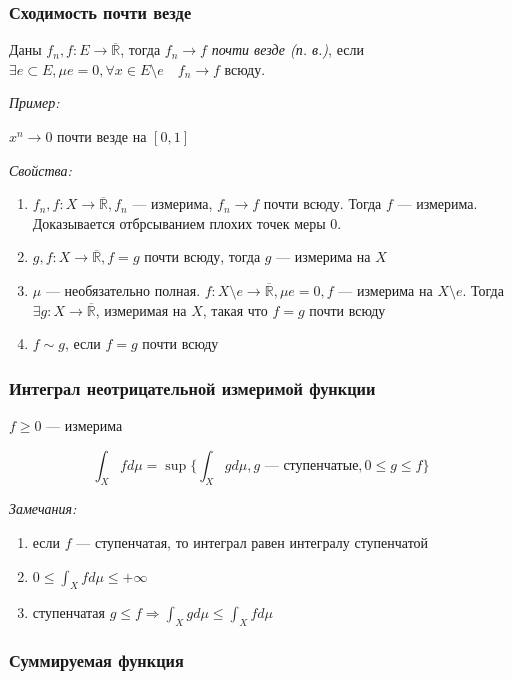 \documentclass{article}
\begin{document}
\subsubsection{Сходимость почти везде}

Даны $f_n, f: E \rightarrow \overline{\mathbb{R}}$, тогда $f_n \rightarrow f$ \textit{почти везде (п. в.)}, если $\exists e \subset E, \mu e =0, \forall x \in E \setminus e \quad f_n \rightarrow f$ всюду.

\textit{Пример: }

$x^n \rightarrow 0$ почти везде на $[0, 1]$

\textit{Свойства: }

\begin{enumerate}
    \item $f_n, f: X \rightarrow \overline{\mathbb{R}}, f_n$ --- измерима, $f_n \rightarrow f$ почти всюду. Тогда $f$ --- измерима. Доказывается отбрсыванием плохих точек меры 0.
    \item $g, f: X \rightarrow \overline{\mathbb{R}}, f = g$ почти всюду, тогда $g$ --- измерима на $X$
    \item $\mu$ --- необязательно полная. $f: X \setminus e \rightarrow \overline{\mathbb{R}}, \mu e = 0, f$ --- измерима на $X \setminus e$. Тогда $\exists g: X \rightarrow \overline{\mathbb{R}}$, измеримая на $X$, такая что $f = g$ почти всюду
    \item $f \sim g$, если $f = g$ почти всюду
\end{enumerate}


\subsubsection{Интеграл неотрицательной измеримой функции}

$f \ge 0$ --- измерима

\[\int_{X} f d \mu = \sup \{\int_{X} g d \mu, g\text{ --- ступенчатые}, 0 \le g \le f\}\]

\textit{Замечания:}

\begin{enumerate}
    \item если $f$ --- ступенчатая, то интеграл равен интегралу ступенчатой
    \item $0 \le \int_{X} f d \mu \le + \infty$
    \item ступенчатая $g \le f \Rightarrow \int_{X} g d \mu \le \int_{X} f d \mu$
\end{enumerate}

\subsubsection{Суммируемая функция}
\end{document}
